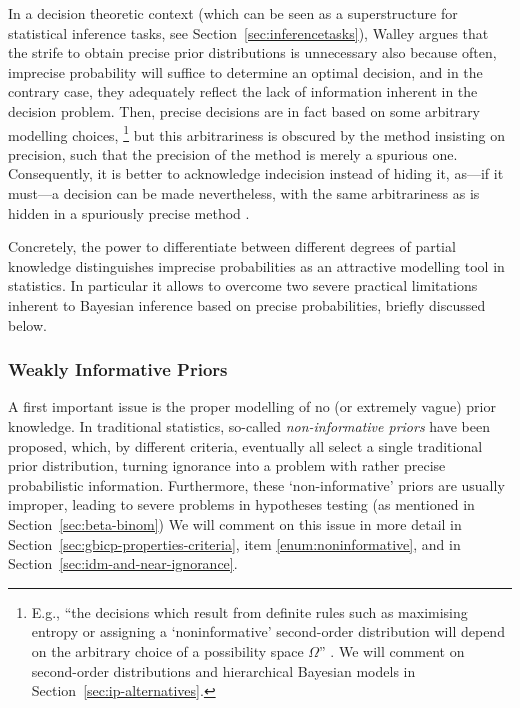 In a decision theoretic context
(which can be seen as a superstructure for statistical inference tasks, see Section~\ref{sec:inferencetasks}),
Walley argues that the strife to obtain precise prior distributions is unnecessary
also because often, imprecise probability will suffice to determine an optimal decision,
and in the contrary case, they adequately reflect the lack of information inherent in the decision problem.
Then, precise decisions are in fact based on some arbitrary modelling choices,%
\footnote{E.g., %
``the decisions which result from definite rules
such as maximising entropy or assigning a `noninformative' second-order distribution
will depend on the arbitrary choice of a possibility space $\Omega$''
\parencite[\S 5.6, footnote~16, p.~531]{1991:walley}.
We will comment on second-order distributions and hierarchical Bayesian models
in Section~\ref{sec:ip-alternatives}.}
but this arbitrariness is obscured by the method insisting on precision,
such that the precision of the method is merely a spurious one.
Consequently, it is better to acknowledge indecision instead of hiding it,
as---if it must---a decision can be made nevertheless,
with the same arbitrariness as is hidden in a spuriously precise method
\parencite[\S 5.7]{1991:walley}.

Concretely, the power to differentiate between different degrees of partial knowledge
distinguishes imprecise probabilities as an attractive modelling tool in statistics.
In particular it allows to overcome two severe practical limitations inherent to Bayesian inference based on precise probabilities,
briefly discussed below.

\subsubsection{Weakly Informative Priors}
\label{sec:motivation:near-ignorance}

A first important issue is the proper modelling of no (or extremely vague) prior knowledge.
In traditional statistics, so-called \emph{non-informative priors} have been proposed, which, by different criteria,
eventually all select a single traditional prior distribution,
turning ignorance into a problem with rather precise probabilistic information.
Furthermore, these `non-informative' priors are usually improper,
leading to severe problems in hypotheses testing (as mentioned in Section~\ref{sec:beta-binom})
We will comment on this issue in more detail in Section~\ref{sec:gbicp-properties-criteria},
item \ref{enum:noninformative}, and in Section~\ref{sec:idm-and-near-ignorance}.

